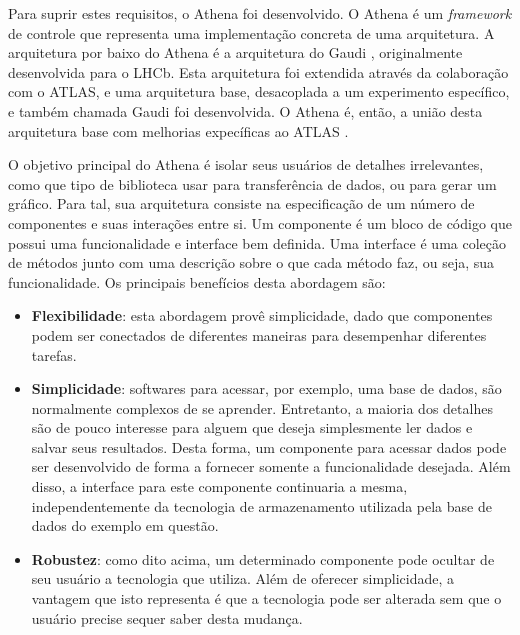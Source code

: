 Para suprir estes requisitos, o Athena foi desenvolvido. O Athena é um \emph{framework} de controle que representa uma implementação concreta de uma arquitetura. A arquitetura por baixo do Athena é a arquitetura do Gaudi \cite{bib:gaudi}, originalmente desenvolvida para o LHCb. Esta arquitetura foi extendida através da colaboração com o ATLAS, e uma arquitetura base, desacoplada a um experimento específico, e também chamada Gaudi foi desenvolvida. O Athena é, então, a união desta arquitetura base com melhorias expecíficas ao ATLAS \cite{bib:athena_dev_guide}. 

O objetivo principal do Athena é isolar seus usuários de detalhes irrelevantes, como que tipo de biblioteca usar para transferência de dados, ou para gerar um gráfico. Para tal, sua arquitetura consiste na especificação de um número de componentes e suas interações entre si. Um componente é um bloco de código que possui uma funcionalidade e interface bem definida. Uma interface é uma coleção de métodos junto com uma descrição sobre o que cada método faz, ou seja, sua funcionalidade. Os principais benefícios desta abordagem são:

\begin{itemize}

\item \textbf{Flexibilidade}: esta abordagem provê simplicidade, dado que componentes podem ser conectados de diferentes maneiras para desempenhar diferentes tarefas.

\item \textbf{Simplicidade}: softwares para acessar, por exemplo, uma base de dados, são normalmente complexos de se aprender. Entretanto, a maioria dos detalhes são de pouco interesse para alguem que deseja simplesmente ler dados e salvar seus resultados. Desta forma, um componente para acessar dados pode ser desenvolvido de forma a fornecer somente a funcionalidade desejada. Além disso, a interface para este componente continuaria a mesma, independentemente da tecnologia de armazenamento utilizada pela base de dados do exemplo em questão. 

\item \textbf{Robustez}: como dito acima, um determinado componente pode ocultar de seu usuário a tecnologia que utiliza. Além de oferecer simplicidade, a vantagem que isto representa é que a tecnologia pode ser alterada sem que o usuário precise sequer saber desta mudança.

\end{itemize}


